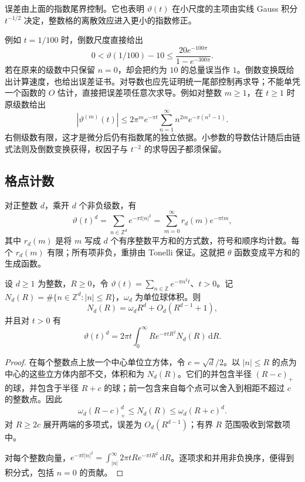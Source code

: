 误差由上面的指数尾界控制。它也表明 \(\vartheta(t)\) 在小尺度的主项由实线 Gauss 积分 \(t^{-1/2}\) 决定，整数格的离散效应进入更小的指数修正。

\ProseParagraphBreak

例如 \(t=1/100\) 时，倒数尺度直接给出
\[
 0<\vartheta(1/100)-10
 \leq\frac{20e^{-100\pi}}{1-e^{-300\pi}}.
\]
若在原来的级数中只保留 \(n=0\)，却会把约为 \(10\) 的总量误当作 \(1\)。倒数变换既给出计算速度，也给出误差证书。对导数也应先证明统一尾部控制再求导；不能单凭一个函数的 \(O\) 估计，直接把误差项任意次求导。例如对整数 \(m\geq1\)，在 \(t\geq1\) 时原级数给出
\[
 |\vartheta^{(m)}(t)|
 \leq2\pi^m e^{-\pi t}\sum_{n=1}^\infty n^{2m}e^{-\pi(n^2-1)}.
\]
右侧级数有限，这才是微分后仍有指数尾的独立依据。小参数的导数估计随后由链式法则及倒数变换获得，权因子与 \(t^{-2}\) 的求导因子都须保留。

\subsection{格点计数}
\label{b2:subsec:060302}

对正整数 \(d\)，乘开 \(d\) 个非负级数，有
\[
 \vartheta(t)^d=\sum_{n\in\mathbb Z^d}e^{-\pi t|n|^2}
 =\sum_{m=0}^\infty r_d(m)e^{-\pi tm},
\]
其中 \(r_d(m)\) 是将 \(m\) 写成 \(d\) 个有序整数平方和的方式数，符号和顺序均计数。每个 \(r_d(m)\) 有限；所有项非负，重排由 Tonelli 保证。这就把 \(\theta\) 函数变成平方和的生成函数。

\begin{proposition}\label{b2:prop:06-lattice-counting}
设 \(d\geq1\) 为整数，\(R\geq0\)，令 \(\vartheta(t)=\sum_{n\in\mathbb Z}e^{-\pi n^2t}\)、\(t>0\)。记 \(N_d(R)=\#\{n\in\mathbb Z^d:|n|\leq R\}\)，\(\omega_d\) 为单位球体积。则
\[
 N_d(R)=\omega_dR^d+O_d(R^{d-1}+1),
\]
并且对 \(t>0\) 有
\[
 \vartheta(t)^d=2\pi t\int_0^\infty R e^{-\pi tR^2}N_d(R)\,\mathrm{d}R.
\]
\end{proposition}
\begin{proof}
在每个整数点上放一个中心单位立方体，令 \(c=\sqrt d/2\)。以 \(|n|\leq R\) 的点为中心的这些立方体内部不交，体积和为 \(N_d(R)\)。它们的并包含半径 \((R-c)_+\) 的球，并包含于半径 \(R+c\) 的球；前一包含来自每个点可以舍入到相距不超过 \(c\) 的整数点。因此
\[
 \omega_d(R-c)_+^d\leq N_d(R)\leq\omega_d(R+c)^d.
\]
对 \(R\geq2c\) 展开两端的多项式，误差为 \(O_d(R^{d-1})\)；有界 \(R\) 范围吸收到常数项中。

对每个整数向量，\(e^{-\pi t|n|^2}=\int_{|n|}^\infty2\pi tR e^{-\pi tR^2}\,\mathrm{d}R\)。逐项求和并用非负换序，便得到积分式，包括 \(n=0\) 的贡献。
\end{proof}

